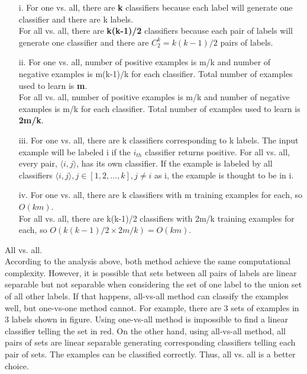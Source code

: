 \item[(a)]
	\begin{itemize}  
	\item[i.]	
	For one vs. all, there are \textbf{k} classifiers because each label will generate one classifier and there are k labels.\\
	For all vs. all, there are \textbf{k(k-1)/2} classifiers because each pair of labels will generate one classifier and there are $C^k_2=k(k-1)/2$ pairs of labels. 
	\item[ii.]
	For one vs. all, number of positive examples is m/k and number of negative examples is m(k-1)/k for each classifier. Total number of examples used to learn is \textbf{m}.\\
	For all vs. all, number of positive examples is m/k and number of negative examples is m/k for each classifier.
	Total number of examples used to learn is \textbf{2m/k}. 
	\item[iii.]
	For one vs. all, there are k classifiers corresponding to k labels. The input example will be labeled i if the $i_{th}$ classifier returns positive.
	For all vs. all, every pair, $\langle i, j \rangle$, has its own classifier. If the example is labeled by all classifiers $\langle i, j \rangle, j\in [1,2,...,k], j\not= i$ as i, the example is thought to be in i.
	\item[iv.]
	For one vs. all, there are k classifiers with m training examples for each, so $O(km)$.\\
	For all vs. all, there are k(k-1)/2 classifiers with 2m/k training examples for each, so $O(k(k-1)/2\times 2m/k)=O(km)$.
	\end{itemize}
\item[(b)]
All vs. all.\\
According to the analysis above, both method achieve the same computational complexity. However, it is possible that sets between all pairs of labels are linear separable but not separable when considering the set of one label to the union set of all other labels. If that happens, all-vs-all method can classify the examples well, but one-vs-one method cannot. For example, there are 3 sets of examples in 3 labels shown in figure. Using one-vs-all method is impossible to find a linear classifier telling the set in red. On the other hand, using all-vs-all method, all pairs of sets are linear separable generating corresponding classifiers telling each pair of sets. The examples can be classified correctly. Thus, all vs. all is a better choice.\\
